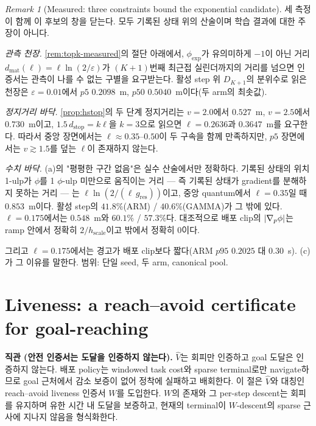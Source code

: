 \documentclass[11pt]{article}
\theoremstyle{plain}
\theoremstyle{definition}
\theoremstyle{remark}
\newtheorem{remark}[theorem]{Remark}
\DeclarePairedDelimiter{\abs}{\lvert}{\rvert}
\newcommand{\Vhat}{\widehat V}
\newcommand{\grad}{\nabla}
\begin{document}
\begin{remark}[Measured: three constraints bound the exponential candidate]\label{rem:exp-measured}
세 측정이 함께 이 후보의 창을 닫는다. 모두 기록된 상태 위의 산술이며 학습 결과에 대한 주장이 아니다.

\emph{관측 천장.} \cref{rem:topk-measured}의 절단 아래에서, $\phi_{\exp}$가 유의미하게 $-1$이 아닌
거리 $d_{\mathrm{mat}}(\ell)=\ell\ln(2/\varepsilon)$가 $(K{+}1)$번째 최근접 실린더까지의 거리를
넘으면 인증서는 관측이 나를 수 없는 구별을 요구받는다. 활성 step 위 $D_{K+1}$의 분위수로 읽은
천장은 $\varepsilon=0.01$에서 $p5$ $0.2098$~m, $p50$ $0.5040$~m이다(두 arm의 최솟값).

\emph{정지거리 바닥.} \cref{prop:hstop}의 두 단계 정지거리는 $v=2.0$에서 $0.527$~m,
$v=2.5$에서 $0.730$~m이고, $1.5\,d_{\mathrm{stop}}=k\ell$을 $k=3$으로 읽으면
$\ell=0.2636$과 $0.3647$~m를 요구한다. 따라서 중앙 장면에서는 $\ell\approx0.35$--$0.50$이 두
구속을 함께 만족하지만, $p5$ 장면에서는 $v\gtrsim1.5$를 덮는 $\ell$이 존재하지 않는다.

\emph{수치 바닥.} (a)의 "평평한 구간 없음"은 실수 산술에서만 정확하다. 기록된 상태의 위치
1-ulp가 $\phi$를 1 $\phi$-ulp 미만으로 움직이는 거리 --- 즉 기록된 상태가 gradient를 분해하지
못하는 거리 --- 는 $\ell\ln(2/(\ell\,g_{\mathrm{res}}))$이고, 중앙 quantum에서 $\ell=0.35$일 때
$0.853$~m이다. 활성 step의 $41.8\%$(ARM) / $40.6\%$(GAMMA)가 그 밖에 있다. $\ell=0.175$에서는
$0.548$~m와 $60.1\%$ / $57.3\%$다. 대조적으로 배포 clip의 $\abs{\grad_p\phi}$는 ramp 안에서 정확히
$2/h_{\mathrm{scale}}$이고 밖에서 정확히 $0$이다.

그리고 $\ell=0.175$에서는 경고가 배포 clip보다 짧다(ARM $p95$ $0.2025$ 대 $0.30$~s). (c)가 그
이유를 말한다. 범위: 단일 seed, 두 arm, canonical pool.
\end{remark}

\section{Liveness: a reach--avoid certificate for goal-reaching}\label{sec:liveness}

\textbf{직관 (안전 인증서는 도달을 인증하지 않는다).}
$\Vhat$는 회피만 인증하고 goal 도달은 인증하지 않는다. 배포 policy는 windowed task cost와 sparse
terminal로만 navigate하므로 goal 근처에서 감소 보증이 없어 정착에 실패하고 배회한다. 이 절은
$\Vhat$와 대칭인 reach--avoid liveness 인증서 $W$를 도입한다. $W$의 존재와 그 per-step descent는
회피를 유지하며 유한 시간 내 도달을 보증하고, 현재의 terminal이 $W$-descent의 sparse 근사에
지나지 않음을 형식화한다.
\end{document}
